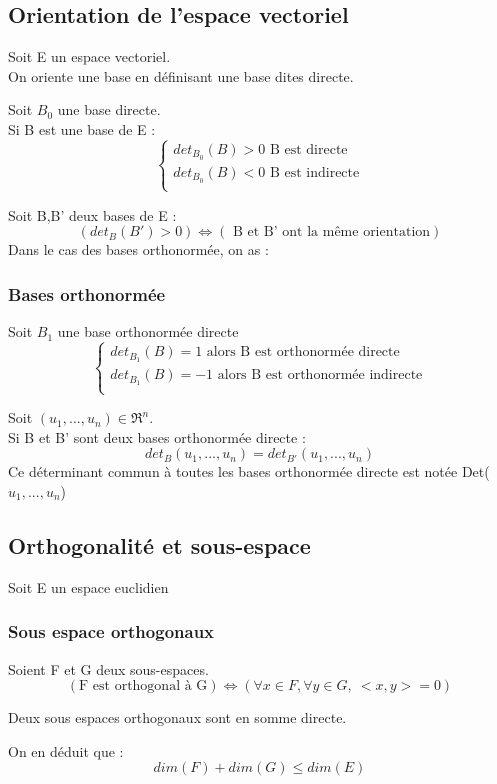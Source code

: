 \subsection{Orientation de l'espace vectoriel}
\begin{de}
Soit E un espace vectoriel.\\
On oriente une base en définisant une base dites directe.
\end{de}
\begin{prop}
Soit $B_0$ une base directe.\\
Si B est une base de E : 
\[\left\{\begin{array}{l}
   det_{B_0}(B) > 0 \mbox{ B est directe}\\
   det_{B_0}(B) < 0 \mbox{ B est indirecte}\\
  \end{array}\right.\]
\end{prop}
\begin{prop}
Soit B,B' deux bases de E :
$$(det_B(B') > 0) \Leftrightarrow (\mbox{ B et B' ont la même orientation})$$
Dans le cas des bases orthonormée, on as : 
\end{prop}
\subsubsection{Bases orthonormée}
\begin{prop}
Soit $B_1$ une base orthonormée directe
\[\left\{\begin{array}{l}
   det_{B_1}(B) = 1 \mbox{ alors B est orthonormée directe}\\
   det_{B_1}(B) = -1 \mbox{ alors B est orthonormée indirecte}\\
  \end{array}\right.\]
\end{prop}
\begin{prop}
Soit $(u_1,...,u_n) \in \Re^n$.\\
Si B et B' sont deux bases orthonormée directe : 
$$det_B(u_1,...,u_n) = det_{B'}(u_1,...,u_n)$$
Ce déterminant commun à toutes les bases orthonormée directe est notée Det($u_1,...,u_n$)
\end{prop}
\subsection{Orthogonalité et sous-espace}
Soit E un espace euclidien
\subsubsection{Sous espace orthogonaux}
\begin{de}
Soient F et G deux sous-espaces.
$$(\mbox{F est orthogonal à G})\Leftrightarrow (\forall x \in F,\forall y \in G,~ <x,y>=0)$$
\end{de}
\begin{prop}
Deux sous espaces orthogonaux sont en somme directe.
\end{prop}
\begin{prop}
On en déduit que : 
$$dim(F)+dim(G) \leq dim(E)$$
\end{prop}
